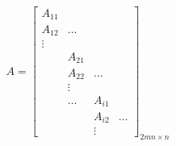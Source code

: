 \documentclass[]{article}
\begin{document}
\begin{equation*}
A = 
\begin{bmatrix}
A_{11} \\
A_{12} & \ldots \\
\vdots \\
   &     A_{21}  \\
   &     A_{22}  & \ldots  \\
   &     \vdots \\
   &   \ldots & A_{i1} \\
   &          & A_{i2} & \ldots\\
   &          & \vdots &  
\end{bmatrix}_{2mn \times n}
\end{equation*}
\end{document}
